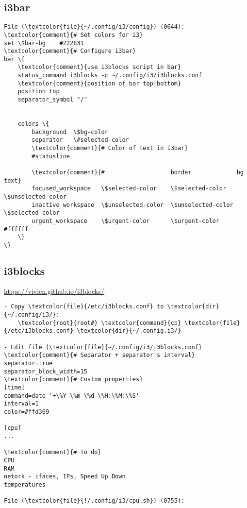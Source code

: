 \documentclass[10pt, a4paper, onecolumn, openany]{book}         %
\begin{document}
\subsection{i3bar}
\begin{Verbatim}[commandchars=\\\{\}]
File (\textcolor{file}{~/.config/i3/config}) (0644):
\textcolor{comment}{# Set colors for i3}
set \$bar-bg    #222831
\textcolor{comment}{# Configure i3bar}
bar \{
    \textcolor{comment}{use i3blocks script in bar}
    status_command i3blocks -c ~/.config/i3/i3blocks.conf
    \textcolor{comment}{position of bar top|bottom}
    position top
    separator_symbol "/"
    
    
    colors \{
        background  \$bg-color
        separator   \#selected-color
        \textcolor{comment}{# Color of text in i3bar}
        #statusline  
        
        \textcolor{comment}{#                   border             bg                 text}
        focused_workspace   \$selected-color    \$selected-color    \$unselected-color
        inactive_workspace  \$unselected-color  \$unselected-color  \$selected-color
        urgent_workspace    \$urgent-color      \$urgent-color      #ffffff
    \}
\}
\end{Verbatim}

\subsection{i3blocks}
\underline{\url{https://vivien.github.io/i3blocks/}}
\begin{Verbatim}[commandchars=\\\{\}]
- Copy \textcolor{file}{/etc/i3blocks.conf} to \textcolor{dir}{~/.config/i3/}:
    \textcolor{root}{root#} \textcolor{command}{cp} \textcolor{file}{/etc/i3blocks.conf} \textcolor{dir}{~/.config.i3/}

- Edit file (\textcolor{file}{~/.config/i3/i3blocks.conf}
\textcolor{comment}{# Separator + separator's interval}
separator=true
separator_block_width=15
\textcolor{comment}{# Custom properties}
[time]
command=date '+\%Y-\%m-\%d \%H:\%M:\%S'
interval=1
color=#ffd369

[cpu]
...

\textcolor{comment}{# To do}
CPU
RAM
netork - ifaces, IPs, Speed Up Down
temperatures

File (\textcolor{file}{!/.config/i3/cpu.sh}) (0755):

\end{Verbatim}
\end{document}
